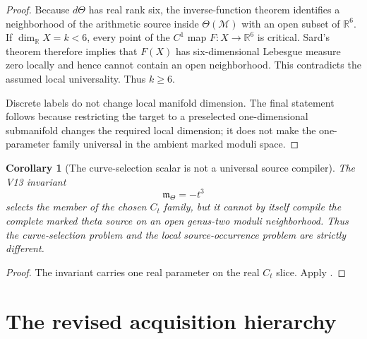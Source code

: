 \documentclass[11pt]{article}
\newtheorem{corollary}[corollary]{Corollary}
\theoremstyle{definition}
\theoremstyle{remark}
\begin{document}
\begin{proof}
Because $d\Theta$ has real rank six, the inverse-function theorem identifies a
neighborhood of the arithmetic source inside $\Theta(\mathcal M)$ with an open
subset of $\mathbb R^6$.  If $\dim_{\mathbb R}X=k<6$, every point of the
$C^1$ map $F:X\to\mathbb R^6$ is critical.  Sard's theorem therefore implies
that $F(X)$ has six-dimensional Lebesgue measure zero locally and hence cannot
contain an open neighborhood.  This contradicts the assumed local
universality.  Thus $k\ge6$.

Discrete labels do not change local manifold dimension.  The final statement
follows because restricting the target to a preselected one-dimensional
submanifold changes the required local dimension; it does not make the
one-parameter family universal in the ambient marked moduli space.
\end{proof}

\begin{corollary}[The curve-selection scalar is not a universal source compiler]
\label{cor:v17-one-scalar-not-universal}
The V13 invariant
\[
 \mathfrak m_\Theta=-t^3
\]
selects the member of the chosen $C_t$ family, but it cannot by itself compile
the complete marked theta source on an open genus-two moduli neighborhood.
Thus the curve-selection problem and the local source-occurrence problem are
strictly different.
\end{corollary}

\begin{proof}
The invariant carries one real parameter on the real $C_t$ slice.  Apply
.
\end{proof}

\section{The revised acquisition hierarchy}
\label{sec:v17-status}
\end{document}
